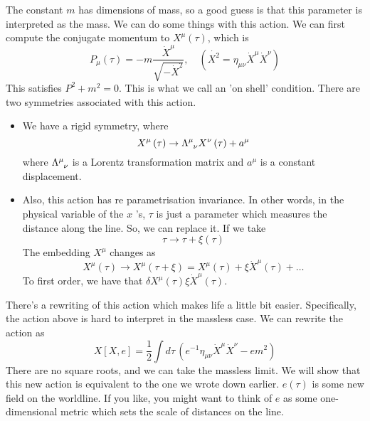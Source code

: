 \documentclass[11pt, oneside]{article}   	%
\theoremstyle{slanted}
\begin{document}
The constant $ m $ has dimensions of mass, 
so a good guess is that this parameter 
is interpreted as the mass. 
We can do some things with this action. 
We can first compute the 
conjugate momentum
to $ X ^ \mu \left( \tau  \right)  $, which is 
\[
 P _ \mu \left(\tau   \right)   =  - m \frac{ \dot{ X  }^ \mu   }{ 
 \sqrt{  - \dot{ X} ^ 2   }  } , \quad \left( \dot{ X ^ 2 }  = \eta_{ \mu \nu } 
 \dot{X } ^ \mu \dot{ X } ^ \nu   \right) 
\] This satisfies $ P ^ 2 + m ^ 2  =  0 $. 
This is what we call an 'on shell' condition. 
There are two symmetries 
associated with this action. 
 \begin{itemize}
	\item  We have a rigid symmetry, where 
		\[
		 X ^ \mu \left( \tau  \right)  \to \Lambda \indices{ ^ \mu _ \nu } 
		 X^ \nu \left( \tau  \right)  +  a ^ \mu 
	 \] where $ \Lambda \indices{ ^ \mu _ \nu }  $ is a Lorentz transformation 
	 matrix and $ a ^ \mu $ is a constant displacement. 
 \item Also, this action has 
	 re parametrisation invariance. In other words, 
	 in the physical variable of the $ x $ 's, $ \tau $ is 
	 just a parameter which measures the distance along the line. 
	 So, we can replace it. 
	 If we take 
	 \[
		 \tau \to \tau + \xi \left( \tau  \right)  
	 \] The embedding $ X ^ \mu $ changes as 
	 \[
	  X ^ \mu \left( \tau  \right)  \to 
	  X ^ \mu \left( \tau + \xi  \right)   = X ^ \mu \left( \tau  \right)  
	  + \xi \dot{ X } ^ \mu \left( \tau  \right)  + \dots  
  \] To first order, we have that $ \delta X ^ \mu \left( \tau  \right)  
  \xi \dot{ X } ^ \mu \left( \tau  \right)   $. 
\end{itemize} 

There's a rewriting 
of this action which makes life a little bit easier. 
Specifically, the action above is 
hard to interpret in the massless case. 
We can rewrite the action 
as \[
  X\left[  X , e  \right]    = \frac{1}{2 } \int 
  d \tau \, (  e ^{ -1 } \eta _{ \mu \nu } \dot{ X } ^ \mu \dot{ X} ^ \nu   
   - e m ^ 2 ) 
\] There are no square roots, and we can take the massless limit. 
We will show that this new action is equivalent to 
the one we wrote down earlier. 
$ e \left( \tau  \right)  $ is some new field on the worldline. 
If you like, you might want to 
think of $ e $ as some one-dimensional metric which 
sets the scale of distances on the line. 
\end{document}
